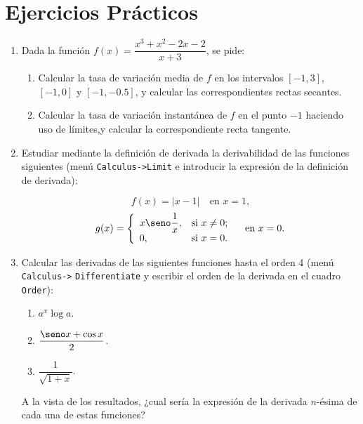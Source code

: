 \documentclass[a4paper]{article}
\begin{document}
\section*{Ejercicios Prácticos}
\begin{enumerate}[leftmargin=*]
\item Dada la función $f(x)=\dfrac{x^3+x^2-2x-2}{x+3}$, se pide:
\begin{enumerate}
\item Calcular la tasa de variación media de $f$ en los intervalos $[-1,3]$, $[-1,0]$ y $[-1,-0.5]$, y calcular las correspondientes rectas secantes. 
\item Calcular la tasa de variación instantánea de $f$ en el punto $-1$ haciendo uso de límites,y calcular la correspondiente recta tangente.
\end{enumerate}

\item Estudiar mediante la definición de derivada la derivabilidad de las funciones
siguientes (menú \texttt{Calculus->Limit} e introducir la expresión de la definición de derivada):


\[
f(x)=|x-1| \quad \textrm{en $x=1$,}
\]
\[
g(x)=\left\{%
\begin{array}{ll}
   x \seno\dfrac{1}{x}, & \hbox{si $x\neq 0$;} \\
   0, & \hbox{si $x=0$.} \\
\end{array}%
\right. \quad \textrm{en $x=0$.}
\]

\item  Calcular las derivadas de las siguientes funciones hasta el orden 4 (menú  \texttt{Calculus->} \texttt{Differentiate} y escribir el orden de la derivada en el cuadro \texttt{Order}):

\begin{enumerate}
\item  $a^x\log a$.

\item  $\dfrac{\seno x +\cos x}{2}$.

\item  $\dfrac{1}{\sqrt{1+x}}$.
\end{enumerate}

A la vista de los resultados, ¿cual sería la expresión de la
derivada $n$-ésima de cada una de estas funciones?

\end{enumerate}
\end{document}
